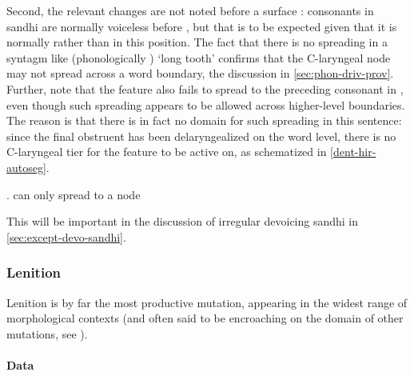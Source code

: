 Second, the relevant changes are not noted before a surface \ipa{[h]}: consonants in sandhi are normally voiceless before \ipa{[h]}, but that is to be expected given that it is normally  rather than  in this position. The fact that there is no spreading in a syntagm like  (phonologically ) `long tooth' confirms that the C-laryngeal node may not spread across a word boundary, \cf the discussion in \cref{sec:phon-driv-prov}. Further, note that the feature  also fails to spread to the preceding consonant in , even though such spreading appears to be allowed across higher\hyp level boundaries. The reason is that there is in fact no domain for such spreading in this sentence: since the final obstruent has been delaryngealized on the word level, there is no C-laryngeal tier for the feature to be active on, as schematized in \ref{dent-hir-autoseg}.

\ex.\label{dent-hir-autoseg} can only spread to a node\\

This will be important in the discussion of irregular devoicing sandhi in \cref{sec:except-devo-sandhi}.


\subsubsection{Lenition}
\label{sec:lenition}

Lenition is by far the most productive mutation, appearing in the widest range of morphological contexts (and often said to be encroaching on the domain of other mutations, see \citealp{humphreys90:_tradit_moder_breton_welsh}).

\paragraph{Data}
\label{sec:dat}

